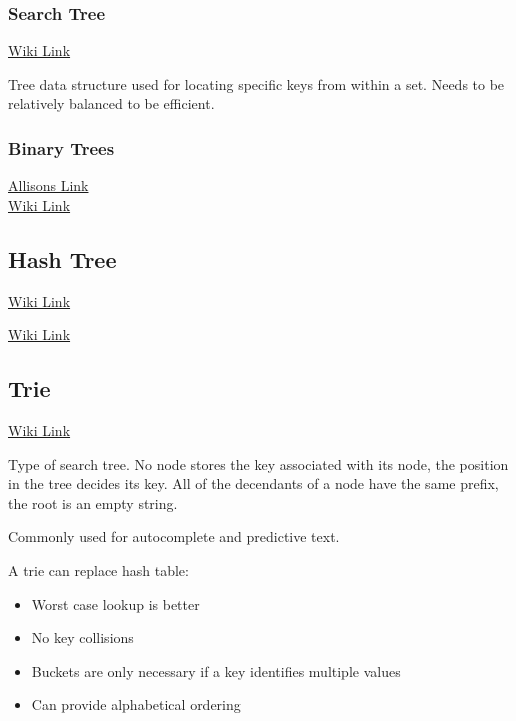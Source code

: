 \subsubsection{Search Tree}

\href{https://en.wikipedia.org/wiki/Search_tree}{Wiki Link}

Tree data structure used for locating specific keys from within a set. Needs to be relatively balanced to be efficient.

\subsubsection{Binary Trees}

\href{http://www.allisons.org/ll/AlgDS/Tree/}{Allisons Link}\\
\href{https://en.wikipedia.org/wiki/Binary_tree}{Wiki Link}


\subsection{Hash Tree}

\href{https://en.wikipedia.org/wiki/Hashed_array_tree}{Wiki Link}

\href{https://en.wikipedia.org/wiki/Merkle_tree}{Wiki Link}

\subsection{Trie}

\href{https://en.wikipedia.org/wiki/Trie}{Wiki Link}

Type of search tree. No node stores the key associated with its node, the position in the tree decides its key. All of the decendants of a node have the same prefix, the root is an empty string.

Commonly used for autocomplete and predictive text. 

A trie can replace hash table:
\begin{itemize}
	\item Worst case lookup is better
	\item No key collisions
	\item Buckets are only necessary if a key identifies multiple values
	\item Can provide alphabetical ordering
\end{itemize}

